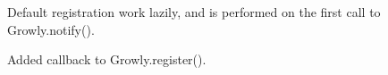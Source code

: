 
\begin{DoxyItemize}
\item Default registration work lazily, and is performed on the first call to {\ttfamily Growly.\+notify()}.
\item Added callback to {\ttfamily Growly.\+register()}. 
\end{DoxyItemize}